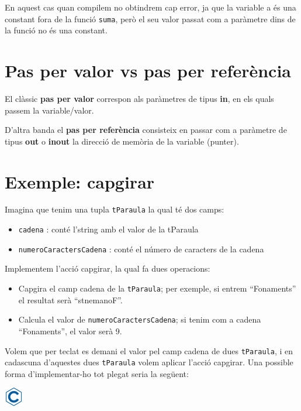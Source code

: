 \documentclass[]{book}
\providecommand{\tightlist}{%
  \setlength{\itemsep}{0pt}\setlength{\parskip}{0pt}}
\begin{document}
En aquest cas quan compilem no obtindrem cap error, ja que la variable a
és una constant fora de la funció \texttt{suma}, però el seu valor
passat com a paràmetre dins de la funció no és una constant.

\section{Pas per valor vs pas per
referència}\label{pas-per-valor-vs-pas-per-referencia}

El clàssic \textbf{pas per valor} correspon als paràmetres de tipus
\textbf{in}, en els quals passem la variable/valor.

D'altra banda el \textbf{pas per referència} consisteix en passar com a
paràmetre de tipus \textbf{out} o \textbf{inout} la direcció de memòria
de la variable (punter).

\section{Exemple: capgirar}\label{exemple-capgirar}

Imagina que tenim una tupla \texttt{tParaula} la qual té dos camps:

\begin{itemize}
\tightlist
\item
  \texttt{cadena} : conté l'string amb el valor de la tParaula
\item
  \texttt{numeroCaractersCadena} : conté el número de caracters de la
  cadena
\end{itemize}

Implementem l'acció capgirar, la qual fa dues operacions:

\begin{itemize}
\tightlist
\item
  Capgira el camp cadena de la \texttt{tParaula}; per exemple, si entrem
  ``Fonaments'' el resultat serà ``stnemanoF''.
\item
  Calcula el valor de \texttt{numeroCaractersCadena}; si tenim com a
  cadena ``Fonaments'', el valor serà 9.
\end{itemize}

Volem que per teclat es demani el valor pel camp cadena de dues
\texttt{tParaula}, i en cadascuna d'aquestes dues \texttt{tParaula}
volem aplicar l'acció capgirar. Una possible forma d'implementar-ho tot
plegat seria la següent:

\includegraphics{./img/c.png}
\end{document}
